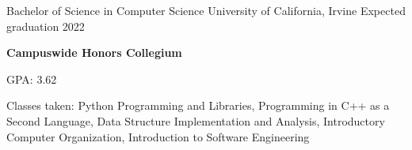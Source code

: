 
\begin{cventries}
  \cventry
    {Bachelor of Science in Computer Science} %
    {University of California, Irvine} %
    {} %
    {Expected graduation 2022} %
    {
      \begin {cvitems}
        \item{\textbf{Campuswide Honors Collegium}}
        \item {GPA: 3.62}
        \item{Classes taken: Python Programming and Libraries, Programming in C++ as a Second Language, Data Structure Implementation and Analysis, \newline
        Introductory Computer Organization, Introduction to Software Engineering}
      \end{cvitems}
    }
\end{cventries}
